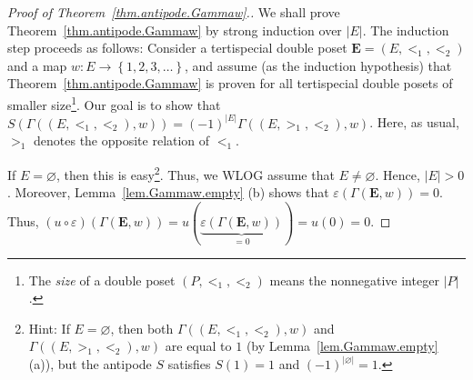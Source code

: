 \documentclass[12pt]{article}
\theoremstyle{plain}
\theoremstyle{definition}
\theoremstyle{remark}
\newcommand{\EE}{{\mathbf{E}}}
\begin{document}
\begin{proof}[Proof of Theorem~\ref{thm.antipode.Gammaw}.]
We shall
prove Theorem~\ref{thm.antipode.Gammaw} by strong induction over
$\left|E\right|$. The induction step proceeds as follows: Consider a
tertispecial double poset $\EE = \left(E, <_1, <_2\right)$ and
a map $w : E \to \left\{1, 2, 3, \ldots\right\}$, and
assume (as the induction hypothesis)
that Theorem~\ref{thm.antipode.Gammaw} is proven for all
tertispecial double posets of smaller size\footnote{The
\textit{size} of a double poset $\left(P, <_1, <_2\right)$
means the nonnegative integer $\left|P\right|$.}.
Our goal
is to show that
$S\left(\Gamma\left(\left(E, <_1, <_2\right), w\right) \right)
= \left(-1\right)^{\left|E\right|}
\Gamma\left(\left(E, >_1, <_2\right), w\right)$.
Here, as usual, $>_1$ denotes the opposite relation of $<_1$.

If $E = \varnothing$, then this is easy\footnote{Hint:
If $E = \varnothing$, then both
$\Gamma\left(\left(E, <_1, <_2\right), w\right)$ and
$\Gamma\left(\left(E, >_1, <_2\right), w\right)$ are equal
to $1$ (by Lemma~\ref{lem.Gammaw.empty} (a)),
but the antipode $S$ satisfies $S\left(1\right) = 1$
and $\left(-1\right)^{\left|\varnothing\right|} = 1$.}.
Thus, we WLOG assume that $E \neq \varnothing$. Hence,
$\left| E \right| > 0$. Moreover,
Lemma~\ref{lem.Gammaw.empty} (b) shows that
$\varepsilon \left( \Gamma\left(\EE, w\right) \right) = 0$. Thus,
$\left( u \circ \varepsilon \right) \left( \Gamma \left( \EE, w \right) \right)
= u \left( \underbrace{\varepsilon \left( \Gamma \left( \EE, w \right) \right)}_{= 0} \right)
= u \left( 0 \right) = 0$.



\end{proof}
\end{document}
